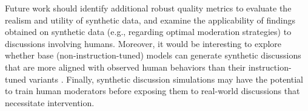 %

Future work should identify additional robust quality metrics to evaluate the realism and utility of synthetic data, and examine the applicability of findings obtained on synthetic data (e.g., regarding optimal moderation strategies) to discussions involving humans. Moreover, it would be interesting to explore whether base  (non-instruction-tuned) models can generate synthetic discussions that are more aligned with observed human behaviors than their instruction-tuned variants \cite{anthis_2025}. Finally, synthetic discussion simulations may have the potential to train human moderators before exposing them to real-world discussions that necessitate intervention.